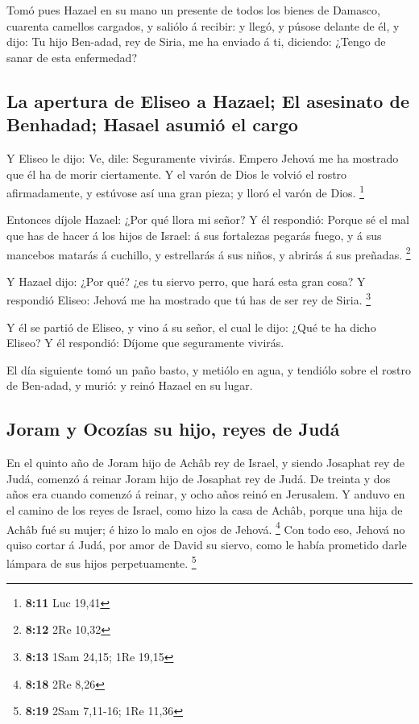  Tomó pues Hazael en su mano un presente de todos los
bienes de Damasco, cuarenta camellos cargados, y saliólo á recibir: y
llegó, y púsose delante de él, y dijo: Tu hijo Ben-adad, rey de Siria,
me ha enviado á ti, diciendo: ¿Tengo de sanar de esta enfermedad?

\hypertarget{la-apertura-de-eliseo-a-hazael-el-asesinato-de-benhadad-hasael-asumiuxf3-el-cargo}{%
\subsection{La apertura de Eliseo a Hazael; El asesinato de Benhadad;
Hasael asumió el
cargo}\label{la-apertura-de-eliseo-a-hazael-el-asesinato-de-benhadad-hasael-asumiuxf3-el-cargo}}

 Y Eliseo le dijo: Ve, dile: Seguramente vivirás. Empero
Jehová me ha mostrado que él ha de morir ciertamente.  Y
el varón de Dios le volvió el rostro afirmadamente, y estúvose así una
gran pieza; y lloró el varón de Dios. \footnote{\textbf{8:11} Luc 19,41}

 Entonces díjole Hazael: ¿Por qué llora mi señor? Y él
respondió: Porque sé el mal que has de hacer á los hijos de Israel: á
sus fortalezas pegarás fuego, y á sus mancebos matarás á cuchillo, y
estrellarás á sus niños, y abrirás á sus preñadas. \footnote{\textbf{8:12}
  2Re 10,32}

 Y Hazael dijo: ¿Por qué? ¿es tu siervo perro, que hará
esta gran cosa? Y respondió Eliseo: Jehová me ha mostrado que tú has de
ser rey de Siria. \footnote{\textbf{8:13} 1Sam 24,15; 1Re 19,15}

 Y él se partió de Eliseo, y vino á su señor, el cual le
dijo: ¿Qué te ha dicho Eliseo? Y él respondió: Díjome que seguramente
vivirás.

 El día siguiente tomó un paño basto, y metiólo en agua,
y tendiólo sobre el rostro de Ben-adad, y murió: y reinó Hazael en su
lugar.

\hypertarget{joram-y-ocozuxedas-su-hijo-reyes-de-juduxe1}{%
\subsection{Joram y Ocozías su hijo, reyes de
Judá}\label{joram-y-ocozuxedas-su-hijo-reyes-de-juduxe1}}

 En el quinto año de Joram hijo de Achâb rey de Israel, y
siendo Josaphat rey de Judá, comenzó á reinar Joram hijo de Josaphat rey
de Judá.  De treinta y dos años era cuando comenzó á
reinar, y ocho años reinó en Jerusalem.  Y anduvo en el
camino de los reyes de Israel, como hizo la casa de Achâb, porque una
hija de Achâb fué su mujer; é hizo lo malo en ojos de Jehová.
\footnote{\textbf{8:18} 2Re 8,26}  Con todo eso, Jehová
no quiso cortar á Judá, por amor de David su siervo, como le había
prometido darle lámpara de sus hijos perpetuamente. \footnote{\textbf{8:19}
  2Sam 7,11-16; 1Re 11,36}

